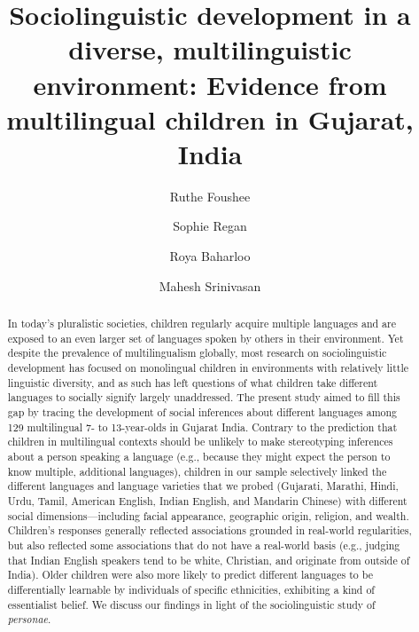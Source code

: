 \documentclass{foushee-adapted-preprint}
\begin{document}
\title{Sociolinguistic development in a diverse, multilinguistic environment: Evidence from multilingual children in Gujarat, India}

\author[1,2, \Letter]{Ruthe Foushee}
\author[2]{Sophie Regan}
\author[2]{Roya Baharloo}
\author[2]{Mahesh Srinivasan}

\maketitle
%
\begin{abstract}
\noindent
In today's pluralistic societies, children regularly acquire multiple languages and are exposed to an even larger set of languages spoken by others in their environment. Yet despite the prevalence of multilingualism globally, most research on sociolinguistic development has focused on monolingual children in environments with relatively little linguistic diversity, and as such has left questions of what children take different languages to socially signify largely unaddressed. The present study aimed to fill this gap by tracing the development of social inferences about different languages among 129 multilingual 7- to 13-year-olds in Gujarat India. Contrary to the prediction that children in multilingual contexts should be unlikely to make stereotyping inferences about a person speaking a language (e.g., because they might expect the person to know multiple, additional languages), children in our sample selectively linked the different languages and language varieties that we probed (Gujarati, Marathi, Hindi, Urdu, Tamil, American English, Indian English, and Mandarin Chinese) with different social dimensions---including facial appearance, geographic origin, religion, and wealth. Children's responses generally reflected associations grounded in real-world regularities, but also reflected some associations that do not have a real-world basis (e.g., judging that Indian English speakers tend to be white, Christian, and originate from outside of India). %
Older children were also more likely to predict different languages to be differentially learnable by individuals of specific ethnicities, exhibiting a kind of essentialist belief. We discuss our findings in light of the sociolinguistic study of \textit{personae}.%
\end{abstract}
\end{document}
